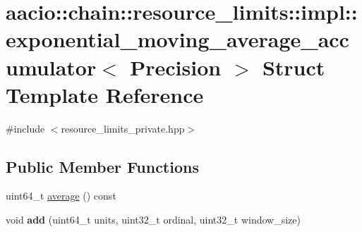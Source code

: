 \hypertarget{structaacio_1_1chain_1_1resource__limits_1_1impl_1_1exponential__moving__average__accumulator}{}\section{aacio\+:\+:chain\+:\+:resource\+\_\+limits\+:\+:impl\+:\+:exponential\+\_\+moving\+\_\+average\+\_\+accumulator$<$ Precision $>$ Struct Template Reference}
\label{structaacio_1_1chain_1_1resource__limits_1_1impl_1_1exponential__moving__average__accumulator}


{\ttfamily \#include $<$resource\+\_\+limits\+\_\+private.\+hpp$>$}

\subsection*{Public Member Functions}
\begin{DoxyCompactItemize}
\item 
uint64\+\_\+t \mbox{\hyperlink{structaacio_1_1chain_1_1resource__limits_1_1impl_1_1exponential__moving__average__accumulator_af26d1c17e57a3a4e6ab2d9dacc54d6ba}{average}} () const
\item 
\mbox{\label{structaacio_1_1chain_1_1resource__limits_1_1impl_1_1exponential__moving__average__accumulator_a642eca4d189312ce7d9f73cd387875c5}} 
void {\bfseries add} (uint64\+\_\+t units, uint32\+\_\+t ordinal, uint32\+\_\+t window\+\_\+size)
\end{DoxyCompactItemize}
